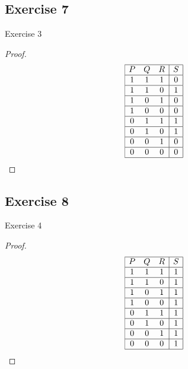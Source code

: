 \documentclass[14pt]{extarticle}
\begin{document}
\subsection{Exercise 7}
Exercise 3

\begin{proof}
    $$
        \begin{array}{|ccc|c|}
            \hline
            P & Q & R & S \\
            \hline
            1 & 1 & 1 & 0 \\
            \hline
            1 & 1 & 0 & 1 \\
            \hline
            1 & 0 & 1 & 0 \\
            \hline
            1 & 0 & 0 & 0 \\
            \hline
            0 & 1 & 1 & 1 \\
            \hline
            0 & 1 & 0 & 1 \\
            \hline
            0 & 0 & 1 & 0 \\
            \hline
            0 & 0 & 0 & 0 \\
            \hline
        \end{array}
    $$
\end{proof}

\subsection{Exercise 8}
Exercise 4

\begin{proof}
    $$
        \begin{array}{|ccc|c|}
            \hline
            P & Q & R & S \\
            \hline
            1 & 1 & 1 & 1 \\
            \hline
            1 & 1 & 0 & 1 \\
            \hline
            1 & 0 & 1 & 1 \\
            \hline
            1 & 0 & 0 & 1 \\
            \hline
            0 & 1 & 1 & 1 \\
            \hline
            0 & 1 & 0 & 1 \\
            \hline
            0 & 0 & 1 & 1 \\
            \hline
            0 & 0 & 0 & 1 \\
            \hline
        \end{array}
    $$
\end{proof}
\end{document}
